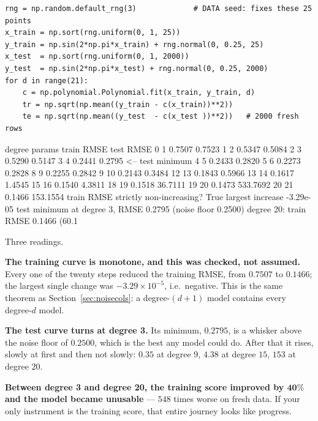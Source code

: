 \documentclass[11pt]{article}
\begin{document}
\begin{lstlisting}
rng = np.random.default_rng(3)             # DATA seed: fixes these 25 points
x_train = np.sort(rng.uniform(0, 1, 25))
y_train = np.sin(2*np.pi*x_train) + rng.normal(0, 0.25, 25)
x_test  = np.sort(rng.uniform(0, 1, 2000))
y_test  = np.sin(2*np.pi*x_test) + rng.normal(0, 0.25, 2000)
for d in range(21):
    c = np.polynomial.Polynomial.fit(x_train, y_train, d)
    tr = np.sqrt(np.mean((y_train - c(x_train))**2))
    te = np.sqrt(np.mean((y_test  - c(x_test ))**2))   # 2000 fresh rows
\end{lstlisting}
\begin{codeout}
degree  params  train RMSE   test RMSE
   0       1      0.7507        0.7523
   1       2      0.5347        0.5084
   2       3      0.5290        0.5147
   3       4      0.2441        0.2795   <-- test minimum
   4       5      0.2433        0.2820
   5       6      0.2273        0.2828
   8       9      0.2255        0.2842
   9      10      0.2143        0.3484
  12      13      0.1843        0.5966
  13      14      0.1617        1.4545
  15      16      0.1540        4.3811
  18      19      0.1518       36.7111
  19      20      0.1473      533.7692
  20      21      0.1466      153.1554
train RMSE strictly non-increasing? True   largest increase -3.29e-05
test minimum at degree 3, RMSE 0.2795   (noise floor 0.2500)
degree 20: train RMSE 0.1466 (60.1%
\end{codeout}

Three readings.

\textbf{The training curve is monotone, and this was checked, not assumed.}
Every one of the twenty steps reduced the training RMSE, from $0.7507$ to
$0.1466$; the largest single change was $-3.29\times10^{-5}$, i.e.\ negative.
This is the same theorem as Section~\ref{sec:noisecols}: a degree-$(d{+}1)$
model contains every degree-$d$ model.

\textbf{The test curve turns at degree 3.} Its minimum, $0.2795$, is a
whisker above the noise floor of $0.2500$, which is the best any model could
do. After that it rises, slowly at first and then not slowly: $0.35$ at degree
$9$, $4.38$ at degree $15$, $153$ at degree $20$.

\textbf{Between degree 3 and degree 20, the training score improved by
$\mathbf{40\%}$ and the model became unusable} --- $548$ times worse on fresh
data. If your only instrument is the training score, that entire journey looks
like progress.
\end{document}
